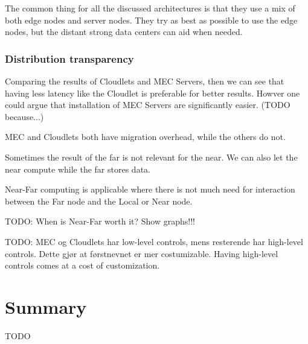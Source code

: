 The common thing for all the discussed architectures is that they use a mix of both edge nodes and server nodes. They try as best as possible to use the edge nodes, but the distant strong data centers can aid when needed. 

\subsubsection{Distribution transparency}
 

Comparing the results of Cloudlets and MEC Servers, then we can see that having less latency like the Cloudlet is preferable for better results. Howver one could argue that installation of MEC Servers are significantly easier. (TODO because...)


MEC and Cloudlets both have migration overhead, while the others do not.

Sometimes the result of the far is not relevant for the near. We can also let the near compute while the far stores data.

Near-Far computing is applicable where there is not much need for interaction between the Far node and the Local or Near node.


TODO: When is Near-Far worth it? Show graphs!!!

TODO: MEC og Cloudlets har low-level controls, mens resterende har high-level controls. Dette gjør at førstnevnet er mer costumizable.
Having high-level controls comes at a cost of customization.


\section{Summary}
TODO
